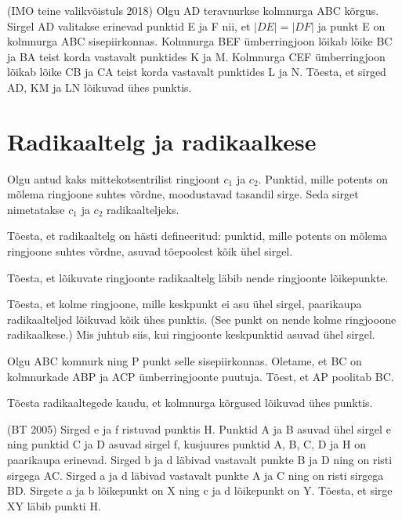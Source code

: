 \documentclass[a4paper,11pt,twocolumn]{article}
\begin{document}
\begin{question}
	(IMO teine valikvõistuls 2018) Olgu AD teravnurkse kolmnurga ABC kõrgus. Sirgel AD valitakse erinevad punktid E ja F nii, et $|DE| = |DF|$ ja punkt E on kolmnurga ABC sisepiirkonnas. Kolmnurga BEF ümberringjoon lõikab lõike BC ja BA teist korda vastavalt punktides K ja M. Kolmnurga CEF ümberringjoon lõikab lõike CB ja CA teist korda vastavalt punktides L ja N. Tõesta, et sirged AD, KM ja LN lõikuvad ühes punktis.
\end{question}

\section{Radikaaltelg ja radikaalkese}

Olgu antud kaks mittekotsentrilist ringjoont $c_1$ ja $c_2$. Punktid, mille potents on mõlema ringjoone suhtes võrdne, moodustavad tasandil sirge. Seda sirget nimetatakse $c_1$ ja $c_2$ radikaalteljeks.

\begin{question}
	Tõesta, et radikaaltelg on hästi defineeritud: punktid, mille potents on mõlema ringjoone suhtes võrdne, asuvad tõepoolest kõik ühel sirgel.
\end{question}

\begin{question}
	Tõesta, et lõikuvate ringjoonte radikaaltelg läbib nende ringjoonte lõikepunkte. 
\end{question}

\begin{question}
	Tõesta, et kolme ringjoone, mille keskpunkt ei asu ühel sirgel, paarikaupa radikaalteljed lõikuvad kõik ühes punktis. (See punkt on nende kolme ringjooone radikaalkese.) Mis juhtub siis, kui ringjoonte keskpunktid asuvad ühel sirgel.
\end{question}

\begin{question}
	Olgu ABC komnurk ning P punkt selle sisepiirkonnas. Oletame, et BC on kolmnurkade ABP ja ACP ümberringjoonte puutuja. Tõest, et AP poolitab BC.
\end{question}

\begin{question}
	Tõesta radikaaltegede kaudu, et kolmnurga kõrgused lõikuvad ühes punktis.
\end{question}

\begin{question}
	(BT 2005) Sirged e ja f ristuvad punktis H. Punktid A ja B asuvad ühel sirgel e ning  punktid C ja D asuvad sirgel f, kusjuures punktid A, B, C, D ja H on paarikaupa erinevad. Sirged b ja d läbivad vastavalt punkte B ja D ning on risti sirgega AC. Sirged a ja d  läbivad vastavalt punkte A ja C ning on risti sirgega BD. Sirgete a ja b lõikepunkt on X ning c ja d lõikepunkt on Y. Tõesta, et sirge XY läbib punkti H.
\end{question}
\end{document}
